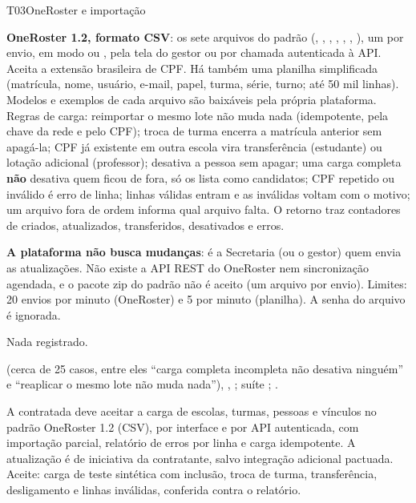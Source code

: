 \begin{resposta}{T03}{OneRoster e importação}{\implementado}
\begin{campos}
  \item[Hoje] \textbf{OneRoster 1.2, formato CSV}: os sete arquivos do padrão
    (, , , ,
    , , ), um por envio, em modo
     ou , pela tela do gestor ou por chamada autenticada à
    API. Aceita a extensão brasileira de CPF. Há também uma planilha
    simplificada (matrícula, nome, usuário, e-mail, papel, turma, série,
    turno; até 50 mil linhas). Modelos e exemplos de cada arquivo são
    baixáveis pela própria plataforma. Regras de carga: reimportar o mesmo
    lote não muda nada (idempotente, pela chave da rede e pelo CPF); troca de
    turma encerra a matrícula anterior sem apagá-la; CPF já existente em outra
    escola vira transferência (estudante) ou lotação adicional (professor);
     desativa a pessoa sem apagar; uma carga completa
    \textbf{não} desativa quem ficou de fora, só os lista como candidatos;
    CPF repetido ou inválido é erro de linha; linhas válidas entram e as
    inválidas voltam com o motivo; um arquivo fora de ordem informa qual
    arquivo falta. O retorno traz contadores de criados, atualizados,
    transferidos, desativados e erros.
  \item[Limitações] \textbf{A plataforma não busca mudanças}: é a Secretaria
    (ou o gestor) quem envia as atualizações. Não existe a API REST do
    OneRoster nem sincronização agendada, e o pacote zip do padrão não é
    aceito (um arquivo por envio). Limites: 20 envios por minuto (OneRoster)
    e 5 por minuto (planilha). A senha do arquivo é ignorada.
  \item[Planejado] Nada registrado.
  \item[Evidência]  (cerca de 25
    casos, entre eles ``carga completa incompleta não desativa ninguém'' e
    ``reaplicar o mesmo lote não muda nada''),
    , ;
    suíte ;
    .
\end{campos}
\end{resposta}

\begin{paraotr}
A contratada deve aceitar a carga de escolas, turmas, pessoas e vínculos no
padrão OneRoster 1.2 (CSV), por interface e por API autenticada, com
importação parcial, relatório de erros por linha e carga idempotente. A
atualização é de iniciativa da contratante, salvo integração adicional
pactuada. Aceite: carga de teste sintética com inclusão, troca de turma,
transferência, desligamento e linhas inválidas, conferida contra o relatório.
\end{paraotr}

